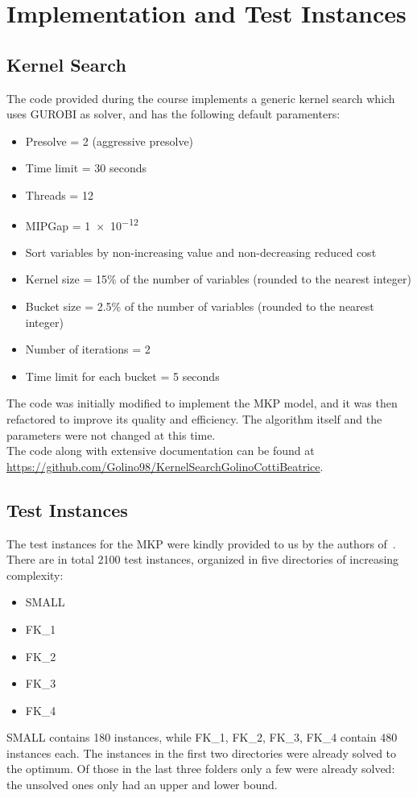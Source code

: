 \chapter{Implementation and Test Instances}


\section{Kernel Search}
The code provided during the course implements a generic kernel search
which uses GUROBI as solver, and has the following default paramenters:
\begin{itemize}
    \item Presolve = 2 (aggressive presolve)
    \item Time limit = 30 seconds
    \item Threads = 12
    \item MIPGap = \num{1e-12}
    \item Sort variables by non-increasing value and non-decreasing reduced cost
    \item Kernel size = 15\% of the number of variables (rounded to the nearest integer)
    \item Bucket size = 2.5\% of the number of variables (rounded to the nearest integer)
    \item Number of iterations = 2
    \item Time limit for each bucket = 5 seconds
\end{itemize}
The code was initially modified to implement the MKP model, and it was then
refactored to improve its quality and efficiency.
The algorithm itself and the parameters were not changed at this time.\\
The code along with extensive documentation can be found at
\url{https://github.com/Golino98/KernelSearchGolinoCottiBeatrice}.


\section{Test Instances}
The test instances for the MKP were kindly provided to us by the authors of~\cite{mkp:2019}.\\
There are in total 2100 test instances, organized in
five directories of increasing complexity:
\begin{itemize}
    \item SMALL
    \item FK\_1
    \item FK\_2
    \item FK\_3
    \item FK\_4
\end{itemize}
SMALL contains 180 instances, while FK\_1, FK\_2, FK\_3, FK\_4 contain 480 instances each.
The instances in the first two directories were already solved to the optimum.
Of those in the last three folders only a few were already solved: the unsolved
ones only had an upper and lower bound.
\newpage


